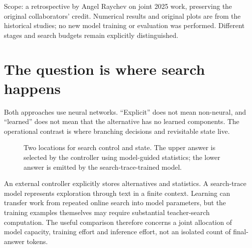 \documentclass[11pt,letterpaper]{article}
\newcommand{\smallnote}[1]{{\small\color{ink}#1}}
\begin{document}
\smallnote{Scope: a retrospective by Angel Raychev on joint 2025 work, preserving the original collaborators' credit. Numerical results and original plots are from the historical studies; no new model training or evaluation was performed. Different stages and search budgets remain explicitly distinguished.}

\section{The question is where search happens}
Both approaches use neural networks. ``Explicit'' does not mean non-neural, and ``learned'' does not mean that the alternative has no learned components. The operational contrast is where branching decisions and revisitable state live.

\begin{figure}[ht]
\centering
\begin{publicationdiagram}
\end{publicationdiagram}
\caption{Two locations for search control and state. The upper answer is selected by the controller using model-guided statistics; the lower answer is emitted by the search-trace-trained model.}
\label{fig:contrast}
\end{figure}

An external controller explicitly stores alternatives and statistics. A search-trace model represents exploration through text in a finite context. Learning can transfer work from repeated online search into model parameters, but the training examples themselves may require substantial teacher-search computation. The useful comparison therefore concerns a joint allocation of model capacity, training effort and inference effort, not an isolated count of final-answer tokens.
\end{document}
